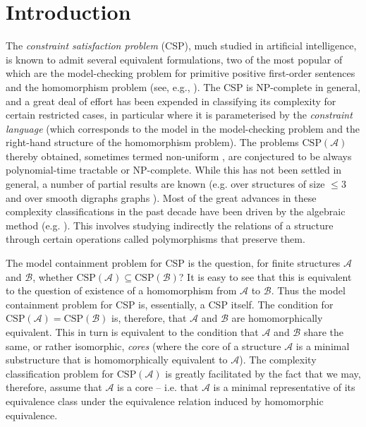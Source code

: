 \documentclass{LMCS}
\begin{document}
\section{Introduction}

The \emph{constraint satisfaction problem} (CSP), much studied in artificial intelligence, is known to admit several equivalent formulations, two of the most popular of which are the model-checking problem for primitive positive first-order sentences and the homomorphism problem (see, e.g., \cite{KolaitisVardiBook05}). The CSP is NP-complete in general, and a great deal of effort has been expended in classifying its complexity for certain restricted cases, in particular where it is parameterised by the \emph{constraint language} (which corresponds to the model in the model-checking problem and the right-hand structure of the homomorphism problem). The problems $\mathrm{CSP}(\mathcal{A})$ thereby obtained, sometimes termed non-uniform \cite{FederVardi}, are conjectured \cite{FederVardi,Bulatov00:algebras} to be always polynomial-time tractable or NP-complete. While this has not been settled in general, a number of partial results are known (e.g. over structures of size $\leq 3$ \cite{Schaefer,BulatovJACM} and over smooth digraphs graphs \cite{HellNesetril,barto:1782}). Most of the great advances in these complexity classifications in the past decade have been driven by the algebraic method (\mbox{e.g.} \cite{BulatovJACM,barto:1782}). This involves studying indirectly the relations of a structure through certain operations called polymorphisms that preserve them.

The model containment problem for CSP is the question, for finite structures $\mathcal{A}$ and $\mathcal{B}$, whether $\mathrm{CSP}(\mathcal{A}) \subseteq \mathrm{CSP}(\mathcal{B})$? It is easy to see that this is equivalent to the question of existence of a homomorphism from $\mathcal{A}$ to $\mathcal{B}$. Thus the model containment problem for CSP is, essentially, a CSP itself. The condition for $\mathrm{CSP}(\mathcal{A}) = \mathrm{CSP}(\mathcal{B})$ is, therefore, that $\mathcal{A}$ and $\mathcal{B}$ are homomorphically equivalent. This in turn is equivalent to the condition that $\mathcal{A}$ and $\mathcal{B}$ share the same, or rather isomorphic, \emph{cores} (where the core of a structure $\mathcal{A}$ is a minimal substructure that is homomorphically equivalent to $\mathcal{A}$). The complexity classification problem for $\mathrm{CSP}(\mathcal{A})$ is greatly facilitated by the fact that we may, therefore, assume that $\mathcal{A}$ is a core -- i.e. that $\mathcal{A}$ is a minimal representative of its equivalence class under the equivalence relation induced by homomorphic equivalence.
\end{document}
